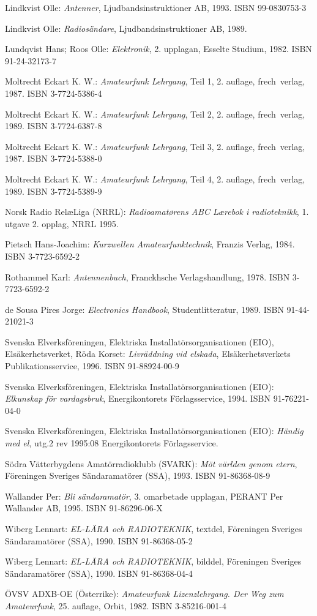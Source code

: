 Lindkvist Olle: \emph{Antenner}, Ljudbandsinstruktioner AB, 1993.
ISBN 99-0830753-3

Lindkvist Olle: \emph{Radiosändare}, Ljudbandsinstruktioner AB, 1989.

Lundqvist Hans; Roos Olle: \emph{Elektronik}, 2. upplagan, Esselte Studium,
1982. ISBN 91-24-32173-7

Moltrecht Eckart K. W.: \emph{Amateurfunk Lehrgang}, Teil 1, 2. auflage,
frech~verlag, 1987. ISBN 3-7724-5386-4

Moltrecht Eckart K. W.: \emph{Amateurfunk Lehrgang}, Teil 2, 2. auflage,
frech~verlag, 1989. ISBN 3-7724-6387-8

Moltrecht Eckart K. W.: \emph{Amateurfunk Lehrgang}, Teil 3, 2. auflage,
frech~verlag, 1987. ISBN 3-7724-5388-0

Moltrecht Eckart K. W.: \emph{Amateurfunk Lehrgang}, Teil 4, 2. auflage,
frech~verlag, 1989. ISBN 3-7724-5389-9

Norsk Radio Rel\ae Liga (NRRL):
\emph{Radioamat\o rens ABC L\ae rebok i radioteknikk}, 1. utgave 2. opplag,
NRRL 1995.

Pietsch Hans-Joachim: \emph{Kurzwellen Amateurfunktechnik}, Franzis Verlag,
1984. ISBN 3-7723-6592-2

Rothammel Karl: \emph{Antennenbuch}, Franckhsche Verlagshandlung, 1978.
ISBN 3-7723-6592-2 \cite{Rothammel2001}

de Sousa Pires Jorge: \emph{Electronics Handbook}, Studentlitteratur, 1989.
ISBN 91-44-21021-3

Svenska Elverksföreningen, Elektriska Installatörsorganisationen (EIO),
Elsäkerhetsverket, Röda Korset: \emph{Livräddning vid elskada},
Elsäkerhetsverkets Publikationsservice, 1996. ISBN 91-88924-00-9

Svenska Elverksföreningen, Elektriska Installatörsorganisationen (EIO):
\emph{Elkunskap för vardagsbruk}, Energikontorets Förlagsservice, 1994.
ISBN 91-76221-04-0

Svenska Elverksföreningen, Elektriska Installatörsorganisationen (EIO):
\emph{Händig med el}, utg.2 rev 1995:08 Energikontorets Förlagsservice.

Södra Vätterbygdens Amatörradioklubb (SVARK): \emph{Möt världen genom etern},
Föreningen Sveriges Sändaramatörer (SSA), 1993. ISBN 91-86368-08-9

Wallander Per: \emph{Bli sändaramatör}, 3. omarbetade upplagan,
PERANT Per Wallander AB, 1995. ISBN 91-86296-06-X

Wiberg Lennart: \emph{EL-LÄRA och RADIOTEKNIK}, textdel,
Föreningen Sveriges Sändaramatörer (SSA), 1990. ISBN 91-86368-05-2

Wiberg Lennart: \emph{EL-LÄRA och RADIOTEKNIK}, bilddel,
Föreningen Sveriges Sändaramatörer (SSA), 1990. ISBN 91-86368-04-4

ÖVSV ADXB-OE (Österrike):
\emph{Amateurfunk Lizenzlehrgang. Der Weg zum Amateurfunk}, 25. auflage,
Orbit, 1982. ISBN 3-85216-001-4
